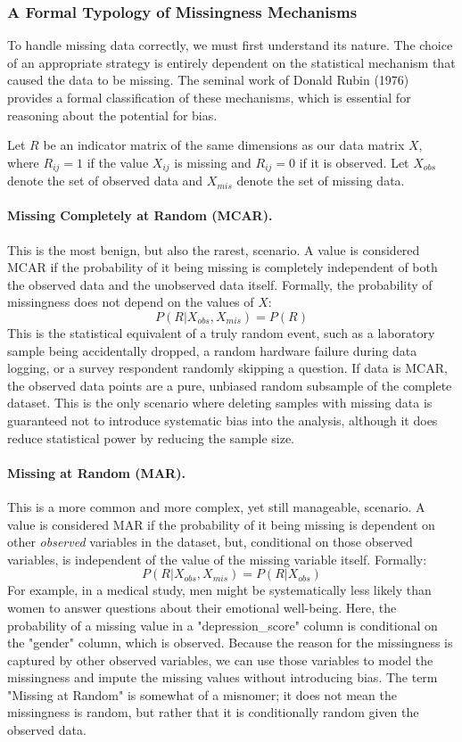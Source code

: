 \begin{itemize}
\subsubsection*{A Formal Typology of Missingness Mechanisms}
To handle missing data correctly, we must first understand its nature. The choice of an appropriate strategy is entirely dependent on the statistical mechanism that caused the data to be missing. The seminal work of Donald Rubin (1976) provides a formal classification of these mechanisms, which is essential for reasoning about the potential for bias.

Let $R$ be an indicator matrix of the same dimensions as our data matrix $X$, where $R_{ij}=1$ if the value $X_{ij}$ is missing and $R_{ij}=0$ if it is observed. Let $X_{obs}$ denote the set of observed data and $X_{mis}$ denote the set of missing data.

\paragraph{Missing Completely at Random (MCAR).} This is the most benign, but also the rarest, scenario. A value is considered MCAR if the probability of it being missing is completely independent of both the observed data and the unobserved data itself. Formally, the probability of missingness does not depend on the values of $X$:
$$ P(R | X_{obs}, X_{mis}) = P(R) $$
This is the statistical equivalent of a truly random event, such as a laboratory sample being accidentally dropped, a random hardware failure during data logging, or a survey respondent randomly skipping a question. If data is MCAR, the observed data points are a pure, unbiased random subsample of the complete dataset. This is the only scenario where deleting samples with missing data is guaranteed not to introduce systematic bias into the analysis, although it does reduce statistical power by reducing the sample size.

\paragraph{Missing at Random (MAR).} This is a more common and more complex, yet still manageable, scenario. A value is considered MAR if the probability of it being missing is dependent on other \textit{observed} variables in the dataset, but, conditional on those observed variables, is independent of the value of the missing variable itself. Formally:
$$ P(R | X_{obs}, X_{mis}) = P(R | X_{obs}) $$
For example, in a medical study, men might be systematically less likely than women to answer questions about their emotional well-being. Here, the probability of a missing value in a "depression\_score" column is conditional on the "gender" column, which is observed. Because the reason for the missingness is captured by other observed variables, we can use those variables to model the missingness and impute the missing values without introducing bias. The term "Missing at Random" is somewhat of a misnomer; it does not mean the missingness is random, but rather that it is conditionally random given the observed data.


\end{itemize}
